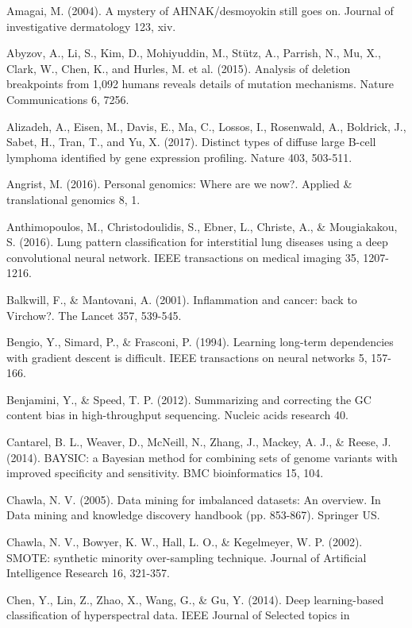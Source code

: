\documentclass{article}
\begin{document}
\begin{list}{}{%
\setlength{\topsep}{0pt}%
\setlength{\leftmargin}{0.5in}%
\setlength{\listparindent}{-0.5in}%
\setlength{\itemindent}{-0.5in}%
\setlength{\parsep}{\parskip}%
}
\item[]\item[] Amagai, M. (2004). A mystery of AHNAK/desmoyokin still goes on. Journal of investigative dermatology 123, xiv.\\\item[] Abyzov, A., Li, S., Kim, D., Mohiyuddin, M., Stütz, A., Parrish, N., Mu, X., Clark, W., Chen, K., and Hurles, M. et al. (2015). Analysis of deletion breakpoints from 1,092 humans reveals details of mutation mechanisms. Nature Communications 6, 7256.\\\item[] Alizadeh, A., Eisen, M., Davis, E., Ma, C., Lossos, I., Rosenwald, A., Boldrick, J., Sabet, H., Tran, T., and Yu, X. (2017). Distinct types of diffuse large B-cell lymphoma identified by gene expression profiling. Nature 403, 503-511.\\\item[] Angrist, M. (2016). Personal genomics: Where are we now?. Applied \& translational genomics 8, 1.\\\item[] Anthimopoulos, M., Christodoulidis, S., Ebner, L., Christe, A., \& Mougiakakou, S. (2016). Lung pattern classification for interstitial lung diseases using a deep convolutional neural network. IEEE transactions on medical imaging 35, 1207-1216.\\\item[] Balkwill, F., \& Mantovani, A. (2001). Inflammation and cancer: back to Virchow?. The Lancet 357, 539-545.\\\item[] Bengio, Y., Simard, P., \& Frasconi, P. (1994). Learning long-term dependencies with gradient descent is difficult. IEEE transactions on neural networks 5, 157-166.\\\item[] Benjamini, Y., \& Speed, T. P. (2012). Summarizing and correcting the GC content bias in high-throughput sequencing. Nucleic acids research 40.\\\item[] Cantarel, B. L., Weaver, D., McNeill, N., Zhang, J., Mackey, A. J., \& Reese, J. (2014). BAYSIC: a Bayesian method for combining sets of genome variants with improved specificity and sensitivity. BMC bioinformatics 15, 104.\\\item[] Chawla, N. V. (2005). Data mining for imbalanced datasets: An overview. In Data mining and knowledge discovery handbook (pp. 853-867). Springer US.\\\item[] Chawla, N. V., Bowyer, K. W., Hall, L. O., \& Kegelmeyer, W. P. (2002). SMOTE: synthetic minority over-sampling technique. Journal of Artificial Intelligence Research 16, 321-357.\\\item[] Chen, Y., Lin, Z., Zhao, X., Wang, G., \& Gu, Y. (2014). Deep learning-based classification of hyperspectral data. IEEE Journal of Selected topics in 
\end{list}
\end{document}
